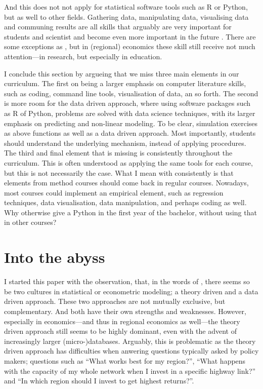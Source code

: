 \documentclass[fleqn,10pt]{SelfArx} %
\begin{document}
And this does not not apply for statistical software tools such as R or Python,
but as well to other fields. Gathering data, manipulating data, visualising data
and communing results are all skills that arguably are very important for
students and scientist and become even more important in the future
\citep{varian2014big}. There are some exceptions as
\citet{schwabish2014economist}, but in (regional) economics these skill still
receive not much attention---in research, but especially in education.

I conclude this section by argueing that we miss three main elements in our
curriculum. The first on being a larger emphasis on computer literature skills, such as coding, command
line tools, visualisation of data, an so forth. The second is more room for the
data driven approach, where using software packages such as R of Python,
problems are solved with data science techniques, with its larger emphasis on
predicting and non-linear modeling. To be clear, simulation exercises as above
functions as well as a data driven approach. Most importantly, students should
understand the underlying mechanism, instead of applying procedures. The third
and final element that is missing is consistently throughout the curriculum.
This is often understood as applying the same tools for each course, but this is
not necessarily the case. What I mean with consistently is that elements from
method courses should come back in regular courses. Nowadays, most courses could
implement an empirical element, such as regression techniques, data
visualisation, data manipulation, and perhaps coding as well. Why otherwise give
a Python in the first year of the bachelor, without using that in other courses?

\section{Into the abyss}

I started this paper with the observation, that, in the words of
\citet{breiman2001statistical}, there seems so be two cultures in statistical or
econometric modeling; a theory driven and a data driven approach. These two
approaches are not mutually exclusive, but complementary. And both have their
own strengths and weaknesses. However, especially in economics---and thus in
regional economics as well---the theory driven approach still seems to be highly
dominant, even with the advent of increasingly larger (micro-)databases.
Arguably, this is problematic as the theory driven approach has difficulties when anwering questions typically
asked by policy makers; questions such as ``What works best for my region?'',
``What happens with the capacity of my whole network when I invest in a specific
highway link?'' and ``In which region should I invest to get highest returns?''.
\end{document}
